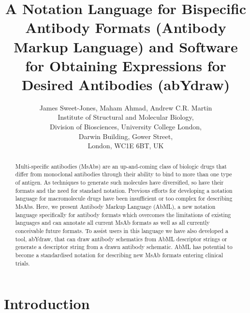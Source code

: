 \documentclass[a4paper]{article}
\title{A Notation Language for Bispecific Antibody Formats (Antibody
Markup Language) and Software for Obtaining Expressions for Desired
Antibodies (abYdraw)}
\author{James Sweet-Jones, Maham Ahmad, Andrew C.R. Martin\\
Institute of Structural and Molecular Biology,\\
Division of Biosciences, University College London,\\
Darwin Building, Gower Street,\\
London, WC1E 6BT, UK}
\begin{document}
\maketitle

\begin{abstract}
Multi-specific antibodies (MsAbs) are an up-and-coming class of biologic
drugs that differ from monoclonal antibodies through their ability to
bind to more than one type of antigen. As techniques to generate such
molecules have diversified, so have their formats and the need for
standard notation. Previous efforts for developing a notation language
for macromolecule drugs have been insufficient or too complex for describing
MsAbs. Here, we present Antibody Markup Language (AbML), a new
notation language specifically for antibody formats which overcomes
the limitations of existing languages and can annotate all
current MsAb formats as well as all currently conceivable future formats.
To assist users in this language we have also
developed a tool, abYdraw, that can draw antibody schematics from AbML
descriptor strings or generate a descriptor string from a drawn
antibody schematic. AbML has potential to become a standardised
notation for describing new MsAb formats entering clinical trials.
\end{abstract}

\section{Introduction}
\end{document}
